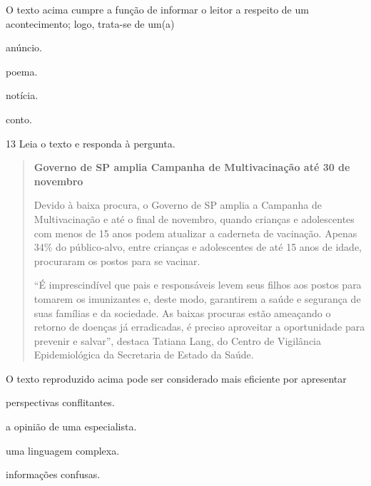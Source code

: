 O texto acima cumpre a função de informar o leitor a respeito de um
acontecimento; logo, trata-se de um(a)

\begin{escolha}
  \item anúncio.

  \item poema.

  \item notícia.

  \item conto.
\end{escolha}



\num{13} Leia o texto e responda à pergunta.

\begin{quote}
\textbf{Governo de SP amplia Campanha de Multivacinação até 30 de novembro}

Devido à baixa procura, o Governo de SP amplia a Campanha de
Multivacinação e até o final de novembro, quando crianças e adolescentes
com menos de 15 anos podem atualizar a caderneta de vacinação. Apenas
34\% do público-alvo, entre crianças e adolescentes de até 15 anos de
idade, procuraram os postos para se vacinar.

``É imprescindível que pais e responsáveis levem seus filhos aos postos
para tomarem os imunizantes e, deste modo, garantirem a saúde e
segurança de suas famílias e da sociedade. As baixas procuras estão
ameaçando o retorno de doenças já erradicadas, é preciso aproveitar a
oportunidade para prevenir e salvar'', destaca Tatiana Lang, do Centro de
Vigilância Epidemiológica da Secretaria de Estado da Saúde.

\end{quote}

O texto reproduzido acima pode ser considerado mais eficiente por
apresentar

\begin{escolha}
  \item perspectivas conflitantes.

  \item a opinião de uma especialista.

  \item uma linguagem complexa.

  \item informações confusas.
\end{escolha}



